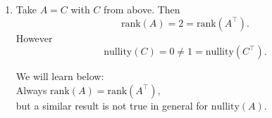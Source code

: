 {\begin{enumerate}
\begin{enumerate}
	\item Since $\ker(A) =\{0\} =\ker(A^\top)$ the $n$ rows and the $n$ columns are independent.
	\item Yes, because from above we know: Independent rows give existence and independent columns uniqueness.
	
\end{enumerate}
 \item  Take $A=C$ with $C$ from above. Then $$\text{rank}(A) = 2 = \text{rank}(A^\top).$$ However 
 $$\text{nullity}(C) = 0 \neq 1 =\text{nullity}(C^\top) .$$
     \begin{center}
  We will learn below:\\	 Always $ \text{rank}(A) = \text{rank}(A^\top),$\\ but a similar result is not true in general for $\text{nullity}(A)$.
 \end{center}
\end{enumerate}
}